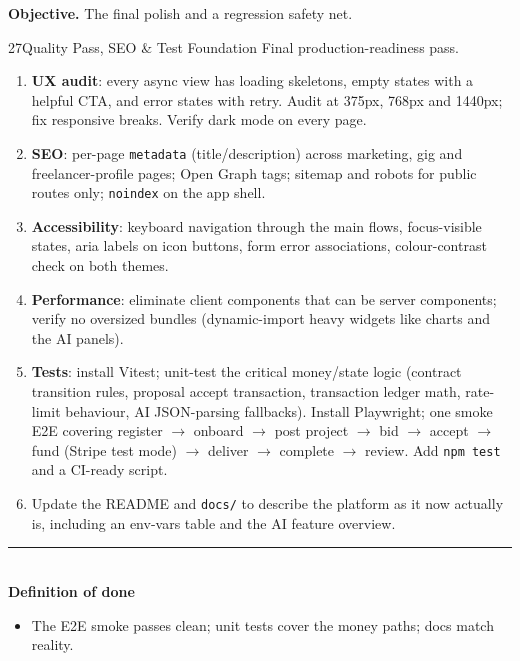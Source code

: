 \documentclass[11pt,a4paper]{article}
\newcommand{\dod}{\medskip\noindent\textcolor{donegreen}{\rule{\linewidth}{0.5pt}}\\[1mm]\textbf{\textcolor{donegreen}{Definition of done}}\\[-2mm]}
\newcommand{\objective}[1]{\noindent\textbf{Objective.} #1\medskip}
\newcommand{\filepath}[1]{\texttt{#1}}
\begin{document}
\objective{The final polish and a regression safety net.}

\begin{promptbox}{27}{Quality Pass, SEO \& Test Foundation}
Final production-readiness pass.

\begin{enumerate}[leftmargin=1.6em]
  \item \textbf{UX audit}: every async view has loading skeletons, empty states
        with a helpful CTA, and error states with retry. Audit at 375px, 768px and
        1440px; fix responsive breaks. Verify dark mode on every page.
  \item \textbf{SEO}: per-page \texttt{metadata} (title/description) across
        marketing, gig and freelancer-profile pages; Open Graph tags; sitemap and
        robots for public routes only; \texttt{noindex} on the app shell.
  \item \textbf{Accessibility}: keyboard navigation through the main flows,
        focus-visible states, aria labels on icon buttons, form error associations,
        colour-contrast check on both themes.
  \item \textbf{Performance}: eliminate client components that can be server
        components; verify no oversized bundles (dynamic-import heavy widgets like
        charts and the AI panels).
  \item \textbf{Tests}: install Vitest; unit-test the critical money/state logic
        (contract transition rules, proposal accept transaction, transaction ledger
        math, rate-limit behaviour, AI JSON-parsing fallbacks). Install Playwright;
        one smoke E2E covering register $\rightarrow$ onboard $\rightarrow$ post
        project $\rightarrow$ bid $\rightarrow$ accept $\rightarrow$ fund (Stripe
        test mode) $\rightarrow$ deliver $\rightarrow$ complete $\rightarrow$ review.
        Add \texttt{npm test} and a CI-ready script.
  \item Update the README and \filepath{docs/} to describe the platform as it now
        actually is, including an env-vars table and the AI feature overview.
\end{enumerate}

\dod
\begin{itemize}[leftmargin=1.6em]
  \item The E2E smoke passes clean; unit tests cover the money paths; docs match
        reality.
\end{itemize}
\end{promptbox}
\end{document}
